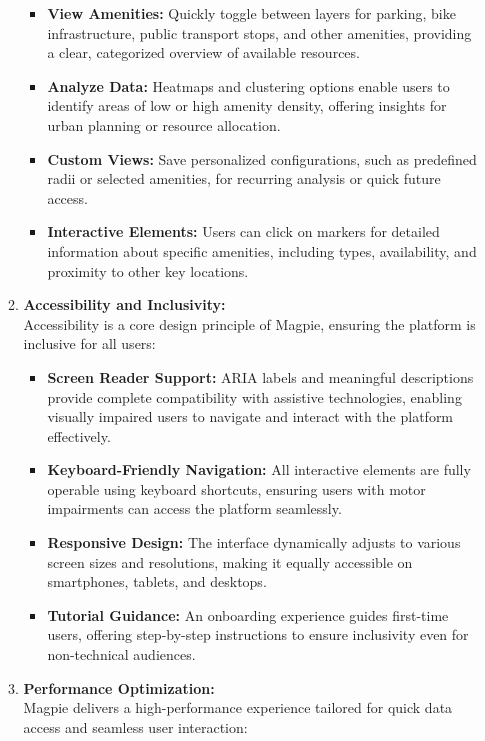 \begin{enumerate}
\begin{enumerate}
        \begin{itemize}
            \item \textbf{View Amenities:} Quickly toggle between layers for parking, bike infrastructure, public transport stops, and other amenities, providing a clear, categorized overview of available resources.
            \item \textbf{Analyze Data:} Heatmaps and clustering options enable users to identify areas of low or high amenity density, offering insights for urban planning or resource allocation.
            \item \textbf{Custom Views:} Save personalized configurations, such as predefined radii or selected amenities, for recurring analysis or quick future access.
            \item \textbf{Interactive Elements:} Users can click on markers for detailed information about specific amenities, including types, availability, and proximity to other key locations.
        \end{itemize}
        \item \textbf{Accessibility and Inclusivity:}\\
        Accessibility is a core design principle of Magpie, ensuring the platform is inclusive for all users:
        \begin{itemize}
            \item \textbf{Screen Reader Support:} ARIA labels and meaningful descriptions provide complete compatibility with assistive technologies, enabling visually impaired users to navigate and interact with the platform effectively.
            \item \textbf{Keyboard-Friendly Navigation:} All interactive elements are fully operable using keyboard shortcuts, ensuring users with motor impairments can access the platform seamlessly.
            \item \textbf{Responsive Design:} The interface dynamically adjusts to various screen sizes and resolutions, making it equally accessible on smartphones, tablets, and desktops.
            \item \textbf{Tutorial Guidance:} An onboarding experience guides first-time users, offering step-by-step instructions to ensure inclusivity even for non-technical audiences.
        \end{itemize}
        \item \textbf{Performance Optimization:}\\
        Magpie delivers a high-performance experience tailored for quick data access and seamless user interaction:

\end{enumerate}
\end{enumerate}
